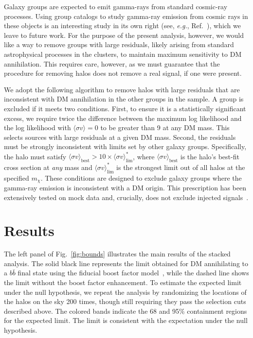 Galaxy groups are expected to emit gamma-rays from standard cosmic-ray processes.  Using group catalogs to study gamma-ray emission from cosmic rays in these objects is an interesting study in its own right (see, {\it e.g.}, Ref.~\cite{Jeltema:2008vu,Huber:2013cia,Ackermann:2015fdi,Rephaeli:2015nca}), which we leave to future work.  For the purpose of the present analysis, however, we would like a way to remove groups with large residuals, likely arising from standard astrophysical processes in the clusters, to maintain maximum sensitivity to DM annihilation.  This requires care, however, as we must guarantee  that the procedure for removing halos does not remove a real signal, if one were present.  

We adopt the following algorithm to remove halos with large residuals that are inconsistent with DM annihilation in the other groups in the sample. A group is excluded if it meets two conditions. First, to ensure it is a statistically significant excess, we require twice the difference between the maximum log likelihood and the log likelihood with $\langle \sigma v \rangle = 0$ to be greater than 9 at any DM mass. This selects sources with large residuals at a given DM mass.  Second, the residuals must be strongly inconsistent with limits set by other galaxy groups. Specifically, the halo  must satisfy $\langle\sigma v\rangle_\text{best} > 10 \times \langle\sigma v\rangle^*_\text{lim}$, where $\langle\sigma v\rangle_\text{best}$ is the halo's best-fit cross section at \emph{any} mass and $\langle\sigma v\rangle^*_\text{lim}$ is the strongest limit out of all halos at the specified $m_\chi$. These conditions are designed to exclude galaxy groups where the gamma-ray emission is inconsistent with a DM origin.  This prescription has been extensively tested on mock data and, crucially, does not exclude injected signals~\cite{companion}.

\section{Results}

The left panel of Fig.~\ref{fig:bounds} illustrates the main results of the stacked analysis.  The solid black line represents the limit obtained for DM annihilating to a $b \bar b$ final state using the fiducial boost factor model~\cite{Bartels:2015uba}, while the dashed line  shows the limit without the boost factor enhancement.  To estimate the expected limit under the null hypothesis, we repeat the analysis by randomizing the locations of the halos on the sky 200 times, though still requiring they pass the selection cuts described above.  
The colored bands indicate the 68 and 95\% containment regions for the expected limit.  
The limit is consistent with the expectation under the null hypothesis.

